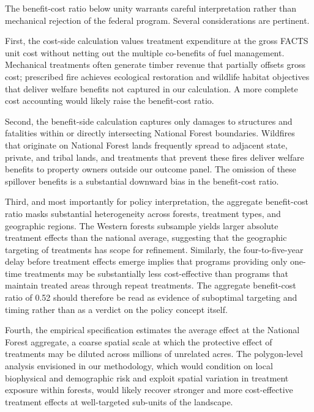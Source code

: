 \documentclass[12pt, letterpaper]{article}
\begin{document}
The benefit-cost ratio below unity warrants careful interpretation rather than mechanical rejection of the federal program. Several considerations are pertinent.

First, the cost-side calculation values treatment expenditure at the gross FACTS unit cost without netting out the multiple co-benefits of fuel management. Mechanical treatments often generate timber revenue that partially offsets gross cost; prescribed fire achieves ecological restoration and wildlife habitat objectives that deliver welfare benefits not captured in our calculation. A more complete cost accounting would likely raise the benefit-cost ratio.

Second, the benefit-side calculation captures only damages to structures and fatalities within or directly intersecting National Forest boundaries. Wildfires that originate on National Forest lands frequently spread to adjacent state, private, and tribal lands, and treatments that prevent these fires deliver welfare benefits to property owners outside our outcome panel. The omission of these spillover benefits is a substantial downward bias in the benefit-cost ratio.

Third, and most importantly for policy interpretation, the aggregate benefit-cost ratio masks substantial heterogeneity across forests, treatment types, and geographic regions. The Western forests subsample yields larger absolute treatment effects than the national average, suggesting that the geographic targeting of treatments has scope for refinement. Similarly, the four-to-five-year delay before treatment effects emerge implies that programs providing only one-time treatments may be substantially less cost-effective than programs that maintain treated areas through repeat treatments. The aggregate benefit-cost ratio of 0.52 should therefore be read as evidence of suboptimal targeting and timing rather than as a verdict on the policy concept itself.

Fourth, the empirical specification estimates the average effect at the National Forest aggregate, a coarse spatial scale at which the protective effect of treatments may be diluted across millions of unrelated acres. The polygon-level analysis envisioned in our methodology, which would condition on local biophysical and demographic risk and exploit spatial variation in treatment exposure within forests, would likely recover stronger and more cost-effective treatment effects at well-targeted sub-units of the landscape.


\end{document}
